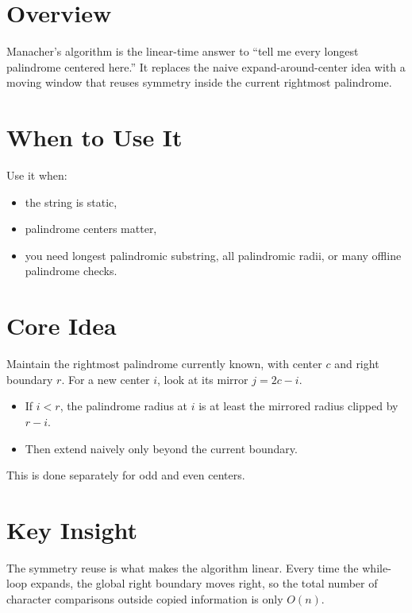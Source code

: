 \section*{Overview}

Manacher's algorithm is the linear-time answer to ``tell me every longest palindrome centered here.'' It replaces the
naive expand-around-center idea with a moving window that reuses symmetry inside the current rightmost palindrome.

\section*{When to Use It}

Use it when:

\begin{itemize}
  \item the string is static,
  \item palindrome centers matter,
  \item you need longest palindromic substring, all palindromic radii, or many offline palindrome checks.
\end{itemize}

\section*{Core Idea}

Maintain the rightmost palindrome currently known, with center \(c\) and right boundary \(r\). For a new center \(i\),
look at its mirror \(j = 2c - i\).

\begin{itemize}
  \item If \(i < r\), the palindrome radius at \(i\) is at least the mirrored radius clipped by \(r - i\).
  \item Then extend naively only beyond the current boundary.
\end{itemize}

This is done separately for odd and even centers.

\section*{Key Insight}

The symmetry reuse is what makes the algorithm linear. Every time the while-loop expands, the global right boundary
moves right, so the total number of character comparisons outside copied information is only \(O(n)\).


